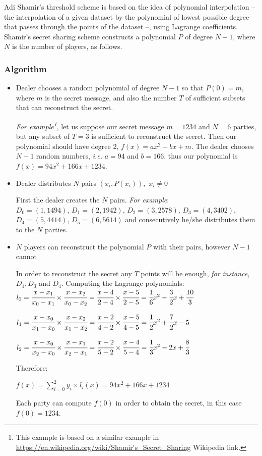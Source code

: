 Adi Shamir's threshold scheme is based on the idea of polynomial interpolation -- the interpolation of a given dataset by the polynomial of lowest possible degree that passes through the points of the dataset --, using Lagrange coefficients.
Shamir's secret sharing scheme constructs a polynomial $P$ of degree $N-1$, where $N$ is the number of players, as follows.


\subsubsection{Algorithm}\label{sss:shamir-algorithm}
\begin{itemize}
  \item Dealer chooses a random polynomial of degree $N - 1$ so that $P(0) = m$, where $m$ is the secret message, and also the number $T$ of sufficient subsets that can reconstruct the secret.

  \textit{For example\footnote{This example is based on a similar example in \url{https://en.wikipedia.org/wiki/Shamir's_Secret_Sharing} Wikipedia link.}}, let us suppose our secret message $m = 1234$ and $N = 6$ parties, but any subset of $T = 3$ is sufficient to reconstruct the secret.
  Then our polynomial should have degree 2, $f(x) = ax^2 + bx + m$.
  The dealer chooses $N - 1$ random numbers, \textit{i.e.} $a = 94$ and $b = 166$, thus our polynomial is $f(x) = 94x^2 + 166x + 1234$.


  \item Dealer distributes $N$ pairs $(x_i , P(x_i)),$ $x_i \neq 0$

  First the dealer creates the $N$ pairs.
  \textit{For example}:\\
  $D_0 = (1, 1494)$, $D_1 = (2, 1942)$, $D_2 = (3, 2578)$, $D_3 = (4, 3402)$, $D_4 = (5, 4414)$, $D_5 = (6, 5614)$ and consecutively he/she distributes them to the $N$ parties.


  \item $N$ players can reconstruct the polynomial $P$ with their pairs, however $N - 1$ cannot

  In order to reconstruct the secret any $T$ points will be enough, \textit{for instance}, $D_1, D_3$ and $D_4$.
  Computing the Lagrange polynomials:\\
  $l_0 = \cfrac{x - x_1}{x_0 - x_1} \times \cfrac{x - x_2}{x_0 - x_2} = \cfrac{x - 4}{2 - 4} \times \cfrac{x - 5}{2 - 5} = \cfrac{1}{6}x^2 - \cfrac{3}{2}x + \cfrac{10}{3}$

  $l_1 = \cfrac{x - x_0}{x_1 - x_0} \times \cfrac{x - x_2}{x_1 - x_2} = \cfrac{x - 2}{4 - 2} \times \cfrac{x - 5}{4 - 5} = \cfrac{1}{2}x^2 + \cfrac{7}{2}x - 5$

  $l_2 = \cfrac{x - x_0}{x_2 - x_0} \times \cfrac{x - x_1}{x_2 - x_1} = \cfrac{x - 2}{5 - 2} \times \cfrac{x - 4}{5 - 4} = \cfrac{1}{3}x^2 - 2x + \cfrac{8}{3}$

  Therefore:

  $f(x) = \sum_{i=0}^{2} y_i \times l_i(x) = 94x^2 + 166x + 1234$

  Each party can compute $f(0)$ in order to obtain the secret, in this case $f(0) = 1234$.
\end{itemize}


